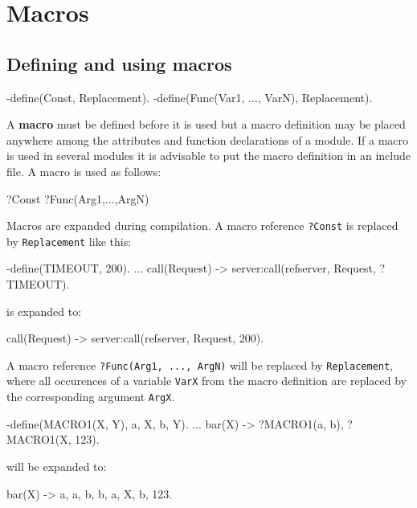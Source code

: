 \chapter{Macros}
\label{macros}

\section{Defining and using macros}

\begin{erlang}
-define(Const, Replacement).
-define(Func(Var1, ..., VarN), Replacement).
\end{erlang}

A \textbf{macro} must be defined before it is used but a macro
definition may be placed anywhere among the attributes and function
declarations of a module. If a macro is used in several modules it is
advisable to put the macro definition in an include file. A macro is
used as follows:

\begin{erlang}
?Const
?Func(Arg1,...,ArgN)
\end{erlang}

Macros are expanded during compilation. A macro reference
\texttt{?Const} is replaced by \texttt{Replacement} like this:

\begin{erlang}
-define(TIMEOUT, 200).
...
call(Request) ->
    server:call(refserver, Request, ?TIMEOUT).
\end{erlang}

is expanded to:

\begin{erlang}
call(Request) ->
    server:call(refserver, Request, 200).
\end{erlang}

A macro reference \texttt{?Func(Arg1, ..., ArgN)} will be replaced by
\texttt{Replacement}, where all occurences of a variable \texttt{VarX}
from the macro definition are replaced by the corresponding argument
\texttt{ArgX}.

\begin{erlang}
-define(MACRO1(X, Y), {a, X, b, Y}).
...
bar(X) ->
    ?MACRO1(a, b),
    ?MACRO1(X, 123).
\end{erlang}

will be expanded to:

\begin{erlang}
bar(X) ->
    {a, a, b, b},
    {a, X, b, 123}.
\end{erlang}

